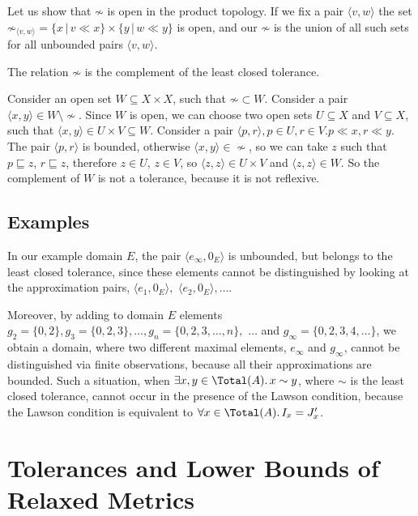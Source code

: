 Let us show that $\not\sim$ is open in
the product topology. If we fix a pair $\langle v, w \rangle$ 
the set $\not\sim_{\langle v, w \rangle}=
\{x \,|\, v \ll x\}  \times \{ y \,|\, w \ll y \}$ is open, and our
$\not\sim$ is the union of all such sets for all unbounded pairs 
$\langle v, w \rangle$.

\begin{theorem}
The relation $\not\sim$ is the complement of the least closed tolerance.
\end{theorem}

\Proof 
Consider an open set $W \subseteq X \times X$, such that
$\not\sim \subset W$. Consider a pair 
$\langle x, y \rangle \in W \setminus
\not\sim$. Since $W$ is
open, we can choose two open sets $U \subseteq X$ and $V \subseteq X$, such that
$\langle x, y \rangle \in U \times V \subseteq W$. 
Consider a pair $\langle p, r \rangle, p \in U, r \in
V.  p \ll x, r \ll y$. 
The pair $\langle p, r \rangle$ is bounded, otherwise
$\langle x, y \rangle \in \not\sim$, 
so we can take $z$ such that $p \sqsubseteq z$, $r
\sqsubseteq z$, therefore $z \in U$, $z \in V$, so 
$\langle z, z \rangle \in U \times V$
and $\langle z, z \rangle \in W$. 
So the complement of $W$ is not a tolerance, because it
is not
reflexive.
\eproof

\subsection{Examples}

In our example domain $E$, the pair $\langle e_{\infty}, 0_E \rangle$ is
unbounded, but belongs to the least closed tolerance, since
these elements cannot be distinguished by looking at the approximation
pairs, $\langle e_1, 0_E \rangle,$ $\langle e_2, 0_E \rangle, \ldots$.

Moreover, by adding to domain $E$ elements
$g_2 = \{0, 2\}, g_3 = \{0, 2, 3\}, \ldots,
g_n = \{0, 2, 3, \ldots, n\},$ $\ldots$ and $g_{\infty} = 
\{0, 2, 3, 4, \ldots \}$,
we obtain a domain, where two different maximal elements, $e_{\infty}$ and
$g_{\infty}$, cannot be distinguished 
via finite observations, because all their
approximations are bounded.
Such a situation, when $\exists x, y \in \Total(A).\, x \sim y$,
where $\sim$ is the least closed tolerance, cannot
occur in the presence of the Lawson condition, because the Lawson condition
is equivalent to $\forall x \in \Total (A).\, I_x = J'_x$.

\section{Tolerances and Lower Bounds of Relaxed Metrics}\label{sec:lowerb}

